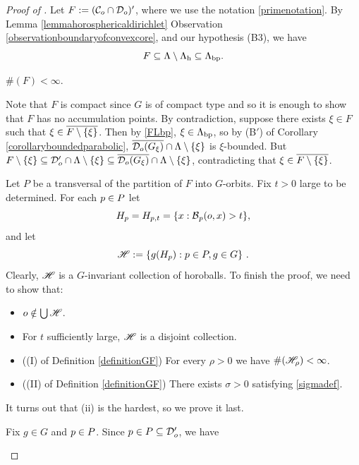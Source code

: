 \begin{proof}[Proof of  \implies {}]
Let $F := (\mathcal C_o \cap \mathcal D_o)'$, where we use the notation \eqref{primenotation}. By Lemma \ref{lemmahorosphericaldirichlet} Observation \ref{observationboundaryofconvexcore}, and our hypothesis (B3), we have
\begin{equation}
\label{FLbp}
F \subseteq \Lambda \setminus \Lambda_{\mathrm h} \subseteq \Lambda_{\mathrm{bp}}.
\end{equation}
\begin{claim}
\label{claimFfinite}
$\#(F) < \infty$.
\end{claim}
\begin{subproof}
Note that $F$ is compact since $G$ is of compact type and so it is enough to show that $F$ has no accumulation points. By contradiction, suppose there exists $\xi\in F$ such that $\xi\in\overline{F \setminus \{ \xi \}}$. Then by \eqref{FLbp}, $\xi\in\Lambda_{\mathrm{bp}}$, so by (B$'$) of Corollary \ref{corollaryboundedparabolic}, $\overline{\mathcal D_o(G_\xi)} \cap \Lambda \setminus \{ \xi \}$ is $\xi$-bounded. But $F \setminus \{ \xi \} \subseteq \mathcal D_o' \cap \Lambda \setminus \{ \xi \} \subseteq \overline{\mathcal D_o(G_\xi)} \cap \Lambda \setminus \{ \xi \}$, contradicting that $\xi\in\overline{F\setminus\{\xi\}}$.
\end{subproof}
Let $P$ be a transversal of the partition of $F$ into $G$-orbits. Fix $t > 0$ large to be determined. For each $p\in P$ let
\[
H_p = H_{p,t} = \{ x : \operatorname{\mathcal B}_p(o,x) > t \},
\]
and let
\begin{equation}
\label{scrHdef}
\mathscr H := \{ g(H_p) : p\in P, g\in G\} \ .
\end{equation}
Clearly, $\mathscr H$ is a $G$-invariant collection of horoballs. To finish the proof, we need to show that:
\begin{itemize}
\item[(i)] $o\notin\bigcup\mathscr H$.
\item[(ii)] For $t$ sufficiently large, $\mathscr H$ is a disjoint collection.
\item[(iii)] ((I) of Definition \ref{definitionGF}) For every $\rho > 0$ we have $\#(\mathscr H_\rho) < \infty$.
\item[(iv)] ((II) of Definition \ref{definitionGF}) There exists $\sigma > 0$ satisfying \eqref{sigmadef}.
\end{itemize}
It turns out that (ii) is the hardest, so we prove it last.
\begin{subproof}
Fix $g\in G$ and $p\in P$. Since $p\in P \subseteq \mathcal D_o'$, we have

\end{subproof}
\end{proof}
